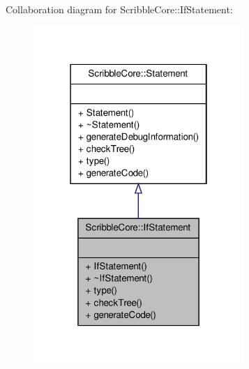 Collaboration diagram for Scribble\-Core\-:\-:If\-Statement\-:
\nopagebreak
\begin{figure}[H]
\begin{center}
\leavevmode
\includegraphics[width=226pt]{class_scribble_core_1_1_if_statement__coll__graph}
\end{center}
\end{figure}
